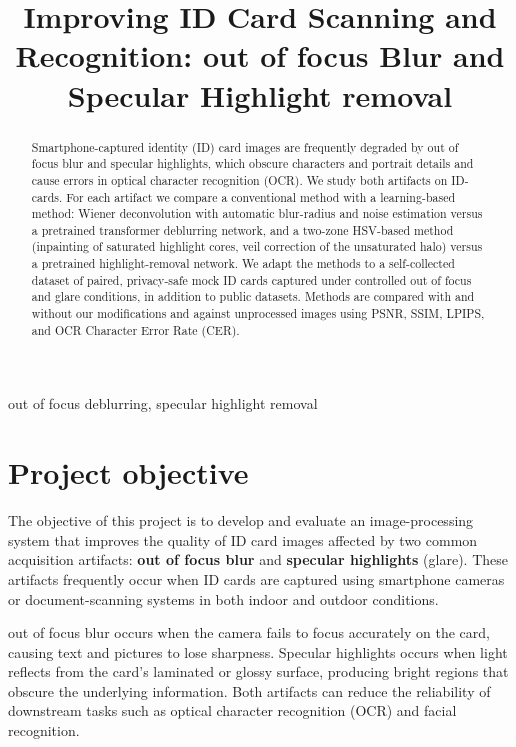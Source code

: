 \documentclass{article}
\title{Improving ID Card Scanning and Recognition: out of focus Blur and Specular Highlight removal}
\begin{document}
%
\maketitle
%
\begin{abstract}
Smartphone-captured identity (ID) card images are frequently degraded by out of focus blur and specular highlights, which obscure characters and portrait details and cause errors in optical character recognition (OCR). We study both artifacts on ID-cards. For each artifact we compare a conventional method with a learning-based method: Wiener deconvolution with automatic blur-radius and noise estimation versus a pretrained transformer deblurring network, and a two-zone HSV-based method (inpainting of saturated highlight cores, veil correction of the unsaturated halo) versus a pretrained highlight-removal network. We adapt the methods to a self-collected dataset of paired, privacy-safe mock ID cards captured under controlled out of focus and glare conditions, in addition to public datasets. Methods are compared with and without our modifications and against unprocessed images using PSNR, SSIM, LPIPS, and OCR Character Error Rate (CER). %
\end{abstract}
%
\begin{keywords}
out of focus deblurring, specular highlight removal
\end{keywords}
%

\section{Project objective}
\label{sec:objective}
The objective of this project is to develop and evaluate an image-processing system that improves the quality of ID card images affected by two common acquisition artifacts: \textbf{out of focus blur} and \textbf{specular highlights} (glare). These artifacts frequently occur when ID cards are captured using smartphone cameras or document-scanning systems in both indoor and outdoor conditions.

out of focus blur occurs when the camera fails to focus accurately on the card, causing text and pictures to lose sharpness. Specular highlights occurs when light reflects from the card's laminated or glossy surface, producing bright regions that obscure the underlying information. Both artifacts can reduce the reliability of downstream tasks such as optical character recognition (OCR) and facial recognition.
\end{document}
